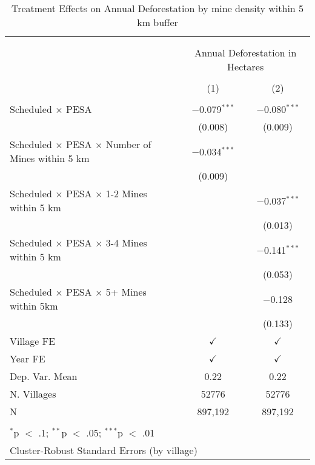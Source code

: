 
\begin{table}[!htbp] \centering \footnotesize
  \caption{Treatment Effects on Annual Deforestation by mine density within 5 km buffer} 
  \label{table:reg_mine_density} 
\begin{tabular}{@{\extracolsep{0pt}}lcc} 
\\[-1.8ex]\hline \\[-1.8ex] 
\\[-1.8ex] & \multicolumn{2}{c}{Annual Deforestation in Hectares} \\ 
\\[-1.8ex] & (1) & (2)\\ 
\hline \\[-1.8ex] 
  Scheduled $\times$ PESA & $-$0.079$^{***}$ & $-$0.080$^{***}$ \\ 
  & (0.008) & (0.009) \\ 
  Scheduled $\times$ PESA $\times$ Number of Mines within 5 km & $-$0.034$^{***}$ &  \\ 
  & (0.009) &  \\ 
  Scheduled $\times$ PESA $\times$ 1-2 Mines within 5 km &  & $-$0.037$^{***}$ \\ 
  &  & (0.013) \\ 
  Scheduled $\times$ PESA $\times$ 3-4 Mines within 5 km &  & $-$0.141$^{***}$ \\ 
  &  & (0.053) \\ 
  Scheduled $\times$ PESA $\times$ 5+ Mines within 5km &  & $-$0.128 \\ 
  &  & (0.133) \\ 
 Village FE & $\checkmark$ & $\checkmark$ \\ 
Year FE & $\checkmark$ & $\checkmark$ \\ 
Dep. Var. Mean & 0.22 & 0.22 \\ 
N. Villages & 52776 & 52776 \\ 
N & 897,192 & 897,192 \\ 
\hline \\[-1.8ex] 
\multicolumn{3}{l}{$^{*}$p $<$ .1; $^{**}$p $<$ .05; $^{***}$p $<$ .01} \\ 
\multicolumn{3}{l}{Cluster-Robust Standard Errors (by village)} \\ 
\end{tabular} 
\end{table} 
